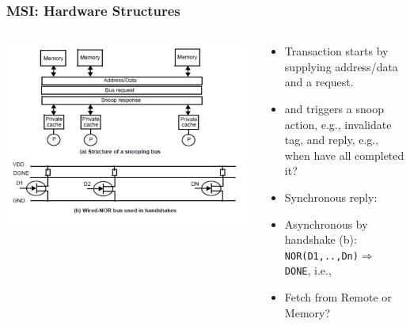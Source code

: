 \documentclass{beamer}
\newcommand{\emp}[1]{\textcolor{DikuRed}{ #1}}
\begin{document}
\begin{frame}[fragile,t]
\frametitle{MSI: Hardware Structures}

\begin{columns}\hspace{-5ex}
\includegraphics[width=47ex]{Figures/FigsInfCoherence/SnoopingBus}
\vspace{-3ex}
\begin{scriptsize}
\begin{itemize}
    \item Transaction starts by supplying \emp{address/data} and a \emp{request}.
    \item and triggers a \emp{snoop action}, e.g., invalidate tag, and \emp{reply},
            e.g., when have all completed it?
    \item \emp{Synchronous} reply:  
    \item \emp{Asynchronous} by handshake (b):\\{{\tt NOR(D1,..,Dn)$\Rightarrow$ DONE}}, i.e.,\\
    \item \emp{Fetch from Remote or Memory?}
\end{itemize}
\end{scriptsize}
\end{columns}

\end{frame}
\end{document}
